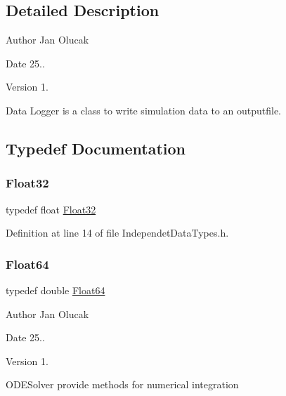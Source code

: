 \subsection{Detailed Description}
\begin{DoxyAuthor}{Author}
Jan Olucak 
\end{DoxyAuthor}
\begin{DoxyDate}{Date}
25.. 
\end{DoxyDate}
\begin{DoxyVersion}{Version}
1.
\end{DoxyVersion}
Data Logger is a class to write simulation data to an outputfile. 

\subsection{Typedef Documentation}
\mbox{\label{group___tools_ga87d38f886e617ced2698fc55afa07637}} 
\subsubsection{\texorpdfstring{Float32}{Float32}}
{\footnotesize\ttfamily typedef float \hyperlink{group___tools_ga87d38f886e617ced2698fc55afa07637}{Float32}}



Definition at line 14 of file Independet\+Data\+Types.\+h.

\mbox{\label{group___tools_ga3f1431cb9f76da10f59246d1d743dc2c}} 
\subsubsection{\texorpdfstring{Float64}{Float64}\hspace{0.1cm}{\footnotesize\ttfamily [1/2]}}
{\footnotesize\ttfamily typedef double \hyperlink{group___tools_ga3f1431cb9f76da10f59246d1d743dc2c}{Float64}}

\begin{DoxyAuthor}{Author}
Jan Olucak 
\end{DoxyAuthor}
\begin{DoxyDate}{Date}
25.. 
\end{DoxyDate}
\begin{DoxyVersion}{Version}
1.
\end{DoxyVersion}
O\+D\+E\+Solver provide methods for numerical integration 

